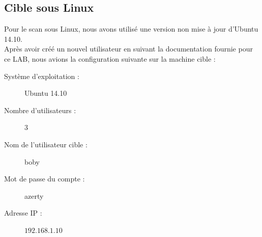 \subsection{Cible sous Linux}
Pour le scan sous Linux, nous avons utilisé une version non mise à jour d'Ubuntu 14.10.\\
Après avoir créé un nouvel utilisateur en suivant la documentation fournie pour ce LAB, nous avions la configuration suivante sur la machine cible :
\begin{description}
 \item[Système d'exploitation :] Ubuntu 14.10
 \item[Nombre d'utilisateurs :] 3
 \item[Nom de l'utilisateur cible :] boby
 \item[Mot de passe du compte :] azerty
 \item[Adresse IP :] $192.168.1.10$
\end{description}


